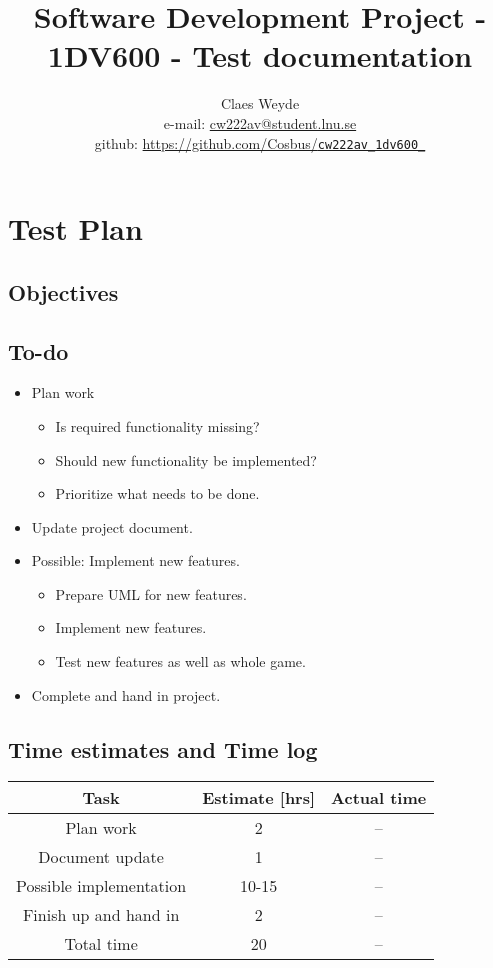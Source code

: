 \documentclass[12pt, letterpaper]{article}
\title{Software Development Project - 1DV600 - Test documentation}
\author{Claes Weyde \\ 
	e-mail: \href{mailto:cw222av@student.lnu.se}{cw222av@student.lnu.se} \\
	github: \href{https://github.com/Cosbus/cw222av_1dv600_}{https://github.com/Cosbus/\texttt{cw222av\_1dv600\_}}}
\begin{document}
\maketitle
\newpage
\tableofcontents{}
\newpage

\section{Test Plan}

\subsection{Objectives}
\subsection{To-do}
\begin{itemize}
	\item Plan work
	\begin{itemize}
		\item Is required functionality missing?
		\item Should new functionality be implemented?
		\item Prioritize what needs to be done.
	\end{itemize}
	\item Update project document.
	\item Possible: Implement new features.
	\begin{itemize}
		\item Prepare UML for new features.
		\item Implement new features.
		\item Test new features as well as whole game.
	\end{itemize}
	\item Complete and hand in project.
\end{itemize}
\subsection{Time estimates and Time log}
\begin{center}
	\begin{tabular}{|c|c|c|} 
		\hline
		Task & Estimate [hrs] & Actual time \\ [0.5ex] 
		\hline\hline
		Plan work & 2 & -- \\ 
		\hline
		Document update & 1 & --\\
		\hline 
		Possible implementation & 10-15 & -- \\ 
		\hline
		Finish up and hand in & 2 & --\\ 
		\hline 
		Total time & 20 & --\\ [1ex]
		\hline
		
	\end{tabular}
\end{center}
\newpage
\end{document}
